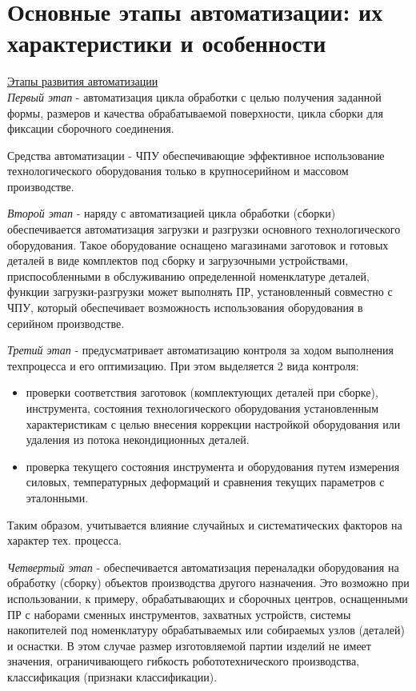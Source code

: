 \documentclass[unicode, 12pt, a4paper, oneside]{article}
\begin{document}
\section{Основные этапы автоматизации:  их характеристики и особенности}

\underline{Этапы развития автоматизации}\\
\textit{Первый этап} - автоматизация цикла обработки с целью получения заданной формы, размеров и качества обрабатываемой поверхности, цикла сборки для фиксации сборочного соединения.

Средства автоматизации - ЧПУ обеспечивающие эффективное использование технологического оборудования только в крупносерийном и массовом производстве.

\textit{Второй этап} - наряду с автоматизацией цикла обработки (сборки) обеспечивается автоматизация загрузки и разгрузки основного технологического оборудования. Такое оборудование оснащено магазинами заготовок и готовых деталей в виде комплектов под сборку и загрузочными устройствами, приспособленными в обслуживанию определенной номенклатуре деталей, функции загрузки-разгрузки может выполнять ПР, установленный совместно с ЧПУ, который обеспечивает возможность использования оборудования в серийном производстве.

\textit{Третий этап} - предусматривает автоматизацию контроля за ходом выполнения техпроцесса и его оптимизацию. При этом выделяется 2 вида контроля:
\begin{itemize}
    \item проверки соответствия заготовок (комплектующих деталей при сборке), инструмента, состояния технологического оборудования установленным характеристикам с целью внесения коррекции настройкой оборудования или удаления из потока некондиционных деталей.
    \item проверка текущего состояния инструмента и оборудования путем измерения силовых, температурных деформаций и сравнения текущих параметров с эталонными.
\end{itemize}

Таким образом, учитывается влияние случайных и систематических факторов на характер тех. процесса.

\textit{Четвертый этап }- обеспечивается автоматизация переналадки оборудования на обработку (сборку) объектов производства другого назначения. Это возможно при использовании, к примеру, обрабатывающих и сборочных центров, оснащенными ПР с наборами сменных инструментов, захватных устройств, системы накопителей под номенклатуру обрабатываемых или собираемых узлов (деталей) и оснастки. В этом случае размер изготовляемой партии изделий не имеет значения, ограничивающего гибкость робототехнического производства, классификация (признаки классификации).
\end{document}
